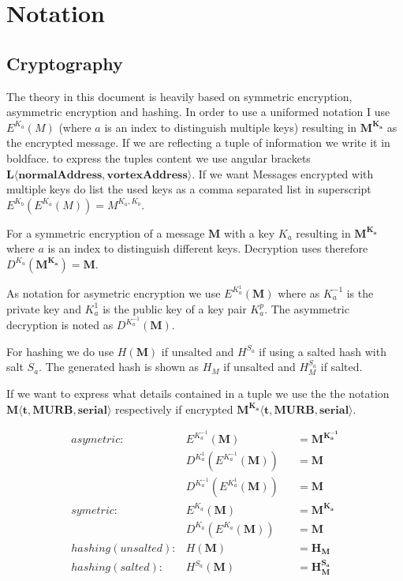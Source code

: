 \section{Notation}
\subsection{Cryptography \label{sec:encNot}}
The theory in this document is heavily based on symmetric encryption, asymmetric encryption and hashing. In order to use a uniformed notation I use $E^{K_a}(M)$ (where $a$ is an index to distinguish multiple keys) resulting in $\mathbf{M^{K_a}}$ as the encrypted message. If we are reflecting a tuple of information we write it in boldface. to express the tuples content we use angular brackets $\mathbf{L\langle normalAddress,vortexAddress\rangle }$. If we want Messages encrypted with multiple keys do list the used keys as a comma separated list in superscript $E^{K_b}\left(E^{K_a}\left(M\right)\right)=M^{{K_{a}},{K_b}}$.

For a symmetric encryption of a message $\mathbf{M}$ with a key $K_a$ resulting in $\mathbf{M^{K_a}}$ where $a$ is an index to distinguish different keys. Decryption uses therefore $D^{K_a}(\mathbf{M^{K_a}})=\mathbf{M}$.

As notation for asymetric encryption we use $E^{K^{1}_a}(\mathbf{M})$ where as $K^{-1}_a$ is the private key and $K^{1}_a$ is the public key of a key pair $K^p_a$. The asymmetric decryption is noted as $D^{K^{-1}_a}(\mathbf{M})$.

For hashing we do use $H(\mathbf{M})$ if unsalted and $H^{S_a}$ if using a salted hash with salt $S_a$. The generated hash is shown as $H_M$ if unsalted and $H^{S_a}_M$ if salted.

If we want to express what details contained in a tuple we use the the notation $\mathbf{M\langle t,MURB,serial\rangle }$ respectively if encrypted $\mathbf{M^{K_{a}}\langle t,MURB,serial\rangle}$.

\begin{align*}
asymetric:         & E^{K^{-1}_a}\left(\mathbf{M}\right)                        	&& =\mathbf{M^{K^{-1}_a}}\\
                   & D^{K^{1}_a}\left(E^{K^{-1}_a}\left(\mathbf{M}\right)\right)	&& =\mathbf{M}\\
                   & D^{K^{-1}_a}\left(E^{K^{1}_a}\left(\mathbf{M}\right)\right)	&& =\mathbf{M}\\
symetric:          & E^{K_a}\left(\mathbf{M}\right)                             	&& =\mathbf{M^{K_a}}\\
                   & D^{K_a}\left(E^{K_a}\left(\mathbf{M}\right)\right)             && =\mathbf{M}\\
hashing (unsalted):& H\left(\mathbf{M}\right)                                   	&& =\mathbf{H_M}\\
hashing (salted):  & H^{S_a}\left(\mathbf{M}\right)                             	&& =\mathbf{H^{S_a}_M}
\end{align*}

